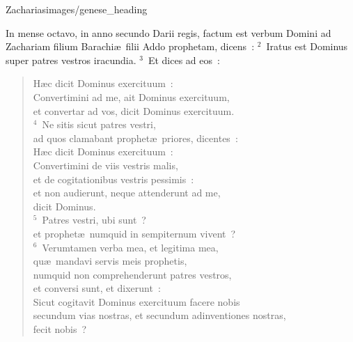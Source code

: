 {Zacharias}{images/genese_heading}


\bchapter
\lettrine[lines=6,image=true,loversize=0.05,lraise=-0.03]{I}{}n mense octavo, in anno secundo Darii regis, factum est verbum Domini ad Zachariam filium Barachi\ae\ filii Addo prophetam, dicens~:
${}^{2}$~Iratus est Dominus super patres vestros iracundia.
${}^{3}$~Et dices ad eos~: \begin{flushleft}\begin{verse}H\ae c dicit Dominus exercituum~:\\ Convertimini ad me, ait Dominus exercituum,\\ et convertar ad vos, dicit Dominus exercituum.\\
${}^{4}$~Ne sitis sicut patres vestri,\\ ad quos clamabant prophet\ae\ priores, dicentes~:\\ H\ae c dicit Dominus exercituum~:\\ Convertimini de viis vestris malis,\\ et de cogitationibus vestris pessimis~:\\ et non audierunt, neque attenderunt ad me,\\ dicit Dominus.\\
${}^{5}$~Patres vestri, ubi sunt~?\\ et prophet\ae\ numquid in sempiternum vivent~?\\
${}^{6}$~Verumtamen verba mea, et legitima mea,\\ qu\ae\ mandavi servis meis prophetis,\\ numquid non comprehenderunt patres vestros,\\ et conversi sunt, et dixerunt~:\\ Sicut cogitavit Dominus exercituum facere nobis\\ secundum vias nostras, et secundum adinventiones nostras,\\ fecit nobis~?\end{verse}\end{flushleft}


